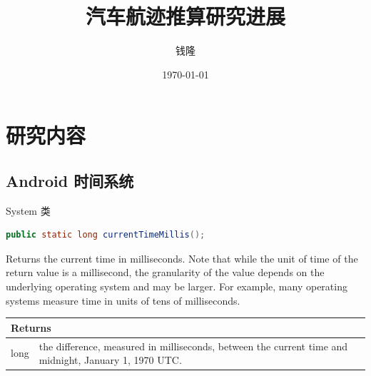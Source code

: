 \documentclass{beamer} %
\title{汽车航迹推算研究进展}
\author{钱隆}
\institute{武汉大学测绘遥感信息工程国家重点实验室}
\date{\today}
\begin{document}
\kaishu

\begin{frame} %
    \titlepage

\end{frame}

\begin{frame}
    \tableofcontents[sectionstyle=show,subsectionstyle=show/shaded/hide,subsubsectionstyle=show/shaded/hide]
\end{frame}


\section{研究内容}

\subsection{Android 时间系统}

\begin{frame}[fragile]{System 类}
    \begin{lstlisting}[language = Java]
public static long currentTimeMillis();
    \end{lstlisting}
    Returns the current time in milliseconds. Note that while the unit of time of the return value is a millisecond, 
    the granularity of the value depends on the underlying operating system and may be larger. 
    For example, many operating systems measure time in units of tens of milliseconds.\\
    \begin{tabularx}{\textwidth}{l|X}
        \toprule
        \multicolumn{2}{l}{Returns}\\
        \midrule
        long & the difference, measured in milliseconds, between the current time and midnight, January 1, 1970 UTC.\\
        \bottomrule
    \end{tabularx}
\end{frame}
\end{document}
